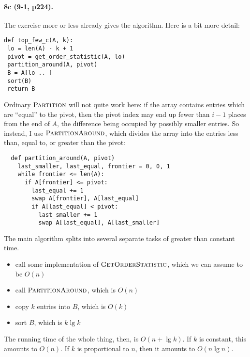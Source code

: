 \documentclass[
]{article}
\begin{document}
\paragraph{8c (9-1, p224).} %
The exercise more or less already gives the algorithm.  Here is a bit more detail:
\begin{verbatim}
def top_few_c(A, k):
 lo = len(A) - k + 1
 pivot = get_order_statistic(A, lo)
 partition_around(A, pivot)
 B = A[lo .. ]
 sort(B)
 return B
\end{verbatim}
 Ordinary $\textsc{Partition}$ will not quite work here: if the array contains entries which are ``equal'' to the pivot, then the pivot index may end up fewer than $i-1$ places from the end of $A$, the difference being occupied by possibly smaller entries.
So instead, I use $\textsc{PartitionAround}$, which divides the array into the entries less than, equal to, or greater than the pivot:
\begin{verbatim}
  def partition_around(A, pivot)
    last_smaller, last_equal, frontier = 0, 0, 1
    while frontier <= len(A):
      if A[frontier] <= pivot:
        last_equal += 1
        swap A[frontier], A[last_equal]
        if A[last_equal] < pivot:
          last_smaller += 1
          swap A[last_equal], A[last_smaller]
\end{verbatim}
The main algorithm splits into several separate tasks of greater than constant time.  
\begin{itemize}
\item call some implementation of $\textsc{GetOrderStatistic}$, which we 
  can assume to be $O(n)$
\item call $\textsc{PartitionAround}$, which is $O(n)$
\item copy $k$ entries into $B$, which is $O(k)$
\item sort $B$, which is $k\lg k$
\end{itemize}
The running time of the whole thing, then, is $O(n + \lg k)$.  If $k$ is constant, this amounts to $O(n)$.  If $k$ is proportional to $n$, then it amounts to $O(n\lg n)$.
\end{document}
